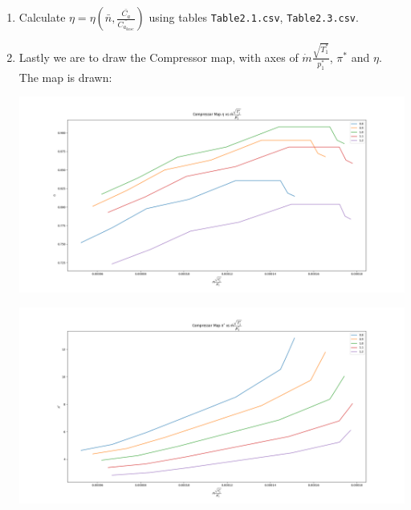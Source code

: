 \documentclass[12pt,english]{article}
\begin{document}
\begin{enumerate}
    \item Calculate $\eta = \eta (\bar{n}, \frac{\bar{C_{a}}}{\bar{C_{a_{base}}}})$ using tables \verb|Table2.1.csv|, \verb|Table2.3.csv|.
    
    \item Lastly we are to draw the Compressor map, with axes of $\dot{m} \frac{\sqrt{T^{*}_{1}}}{p^{*}_{1}}$, $\pi^{*}$ and $\eta$. The map is drawn:
    
    \begin{center}
        \includegraphics[width=\textwidth]{CompressorMap1.png}

    
        \includegraphics[width=\textwidth]{CompressorMap2.png}

    \end{center}
\end{enumerate}
\end{document}
